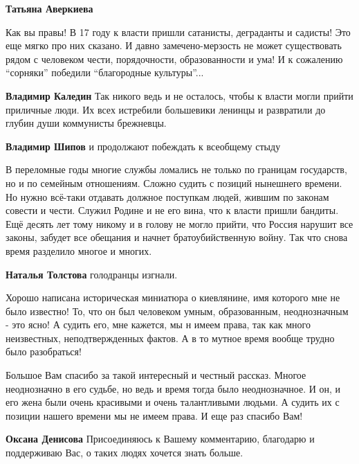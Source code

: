 \begin{itemize}
\begin{itemize} %
\textbf{Татьяна Аверкиева} 

Как вы правы! В 17 году к власти пришли сатанисты, деграданты и садисты! Это
еще мягко про них сказано. И давно замечено-мерзость не может существовать
рядом с человеком чести, порядочности, образованности и ума! И к сожалению
\enquote{сорняки} победили \enquote{благородные культуры}...

\textbf{Владимир Каледин} Так никого ведь и не осталось, чтобы к власти могли прийти приличные люди. Их всех истребили большевики ленинцы и развратили до глубин души коммунисты брежневцы.

\textbf{Владимир Шипов} и продолжают побеждать к всеобщему стыду
\end{itemize} %


В переломные годы многие службы ломались не только по границам государств, но и
по семейным отношениям. Сложно судить с позиций нынешнего времени. Но нужно
всё-таки отдавать должное поступкам людей, жившим по законам совести и чести.
Служил Родине и не его вина, что к власти пришли бандиты. Ещё десять лет тому
никому и в голову не могло прийти, что Россия нарушит все законы, забудет все
обещания и начнет братоубийственную войну. Так что снова время разделило многое
и многих.


\textbf{Наталья Толстова} голодранцы изгнали.


Хорошо написана историческая миниатюра о киевлянине, имя которого мне не было
известно! То, что он был человеком умным, образованным, неоднозначным - это
ясно! А судить его, мне кажется, мы н имеем права, так как много неизвестных,
неподтвержденных фактов. А в то мутное время вообще трудно было разобраться!


Большое Вам спасибо за такой интересный и честный рассказ. Многое неоднозначно
в его судьбе, но ведь и время тогда было неоднозначное. И он, и его жена были
очень красивыми и очень талантливыми людьми. А судить их с позиции нашего
времени мы не имеем права. И еще раз спасибо Вам!

\begin{itemize} %
\textbf{Оксана Денисова} Присоединяюсь к Вашему комментарию, благодарю и поддерживаю Вас, о таких людях хочется знать больше.
\end{itemize} %


\end{itemize}
